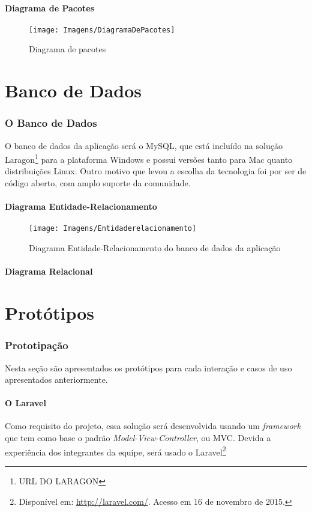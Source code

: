 \documentclass[12pt,oneside,a4paper,article]{abntex2}
\begin{document}
		\subsection{Diagrama de Pacotes}
		\begin{figure}[h]
			\centering
			\texttt{[image: Imagens/DiagramaDePacotes]}
			\caption{Diagrama de pacotes}
			\label{fig:diagramapacotes}
		\end{figure}
			

\part{Banco de Dados}
	\section{O Banco de Dados}
		O banco de dados da aplicação será o MySQL, que está incluído na solução Laragon\footnote{URL DO LARAGON} para a plataforma Windows e possui versões tanto para Mac quanto distribuições Linux. Outro motivo que levou a escolha da tecnologia foi por ser de código aberto, com amplo suporte da comunidade.
		
		\subsection{Diagrama Entidade-Relacionamento}
			\begin{figure}[h]
				\centering
				\texttt{[image: Imagens/Entidaderelacionamento]}
				\caption{Diagrama Entidade-Relacionamento do banco de dados da aplicação}
				\label{fig:Entidaderelacionamento}
			\end{figure}

	
		\subsection{Diagrama Relacional}
	

\part{Protótipos}
	\section{Prototipação}
		Nesta seção são apresentados os protótipos para cada interação e casos de uso apresentados anteriormente.
		
		\subsection{O Laravel}
			Como requisito do projeto, essa solução será desenvolvida usando um \textit{framework} que tem como base o padrão \textit{Model-View-Controller}, ou MVC.
			Devida a experiência dos integrantes da equipe, será usado o Laravel\footnote{Disponível em: \url{http://laravel.com/}. Acesso em 16 de novembro de 2015.}
	
\end{document}
